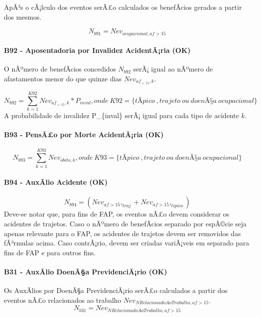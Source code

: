 \documentclass[]{article}
\let\oldparagraph\paragraph
\renewcommand{\paragraph}[1]{\oldparagraph{#1}\mbox{}}
\begin{document}
ApÃ³s o cÃ¡lculo dos eventos serÃ£o calculados os benefÃ­cios gerados a
partir dos mesmos.

\[N_{b91} = Nev_{ocupacional, af>15}\]

\paragraph{B92 - Aposentadoria por Invalidez AcidentÃ¡ria
(OK)}\label{b92---aposentadoria-por-invalidez-acidentaria-ok}

O nÃºmero de benefÃ­cios concedidos \(N_{b92}\) serÃ¡ igual ao nÃºmero
de afastamentos menor do que quinze dias \(Nev_{af_{<15},k}\).

\[N_{b92} = \sum_{k=1}^{K92}{Nev_{af_{>15},k}}  * P_{inval} , onde \ K92 = \{tÃ­pico \ , trajeto \  ou \ doenÃ§a \ ocupacional\} \]
A probabilidade de invalidez P\_\{inval\} serÃ¡ igual para cada tipo de
acidente \(k\).

\paragraph{B93 - PensÃ£o por Morte AcidentÃ¡ria
(OK)}\label{b93---pensao-por-morte-acidentaria-ok}

\[N_{b93} = \sum_{k=1}^{K93}Nev_{obito, k}, onde \ K93 = \{tÃ­pico \ , trajeto \  ou \ doenÃ§a \ ocupacional\}\]

\paragraph{B94 - AuxÃ­lio Acidente
(OK)}\label{b94---auxalio-acidente-ok}

\[N_{b94} = (Nev_{af>15},_{traj} + Nev_{af>15},_{tipico})\] Deve-se
notar que, para fins de FAP, os eventos nÃ£o devem considerar os
acidentes de trajetos. Caso o nÃºmero de benefÃ­cios separado por
espÃ©cie seja apenas relevante para o FAP, os acidentes de trajetos
devem ser removidos das fÃ³rmulas acima. Caso contrÃ¡rio, devem ser
criadas variÃ¡veis em separado para fins de FAP e para outros fins.

\paragraph{B31 - AuxÃ­lio DoenÃ§a PrevidenciÃ¡rio
(OK)}\label{b31---auxalio-doenaa-previdenciario-ok}

Os AuxÃ­lios por DoenÃ§a PrevidenciÃ¡rio serÃ£o calculados a partir dos
eventos nÃ£o relacionados ao trabalho
\(Nev_{NRelacionadoAoTrabalho, af>15}\).
\[N_{b31} = Nev_{NRelacionadoAoTrabalho, af>15}\]
\end{document}
